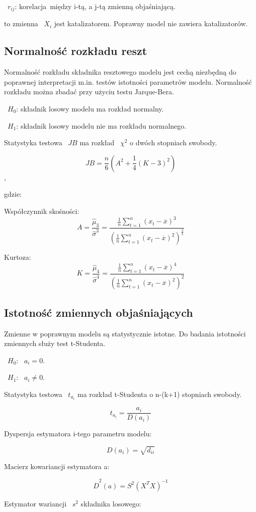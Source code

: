 \documentclass{article}
\begin{document}
~$r_{ij}$: korelacja między i-tą, a j-tą zmienną objaśniającą.

to zmienna ~$X_i$ jest katalizatorem. Poprawny model nie zawiera katalizatorów.

\newpage
\subsection{Normalność rozkładu reszt}
Normalność rozkładu składnika resztowego modelu jest cechą niezbędną do poprawnej interpretacji m.in. testów istotności parametrów modelu. Normalność rozkładu można zbadać przy użyciu testu Jarque-Bera.

~$H_0$: składnik losowy modelu ma rozkład normalny.

~$H_1$: składnik losowy modelu nie ma rozkładu normalnego.

Statystyka testowa ~$JB$ ma rozkład ~$\chi^2$ o dwóch stopniach swobody.

\[JB=\frac{n}{6}(A^2+\frac{1}{4}(K-3)^2)\],

gdzie:

Współczynnik skośności:
\[A = \frac{\hat{\mu}_3}{\hat{\sigma}^3} = 
\frac{\frac{1}{n} \sum_{t=1}^{n} ( x_t - \overline{x} )^3}
{(\frac{1}{n} \sum_{t=1}^{n} ( x_t - \overline{x} )^2)^{\frac{3}{2}}}
\]

Kurtoza:
\[K = \frac{\hat{\mu}_4}{\hat{\sigma}^4} = 
\frac{\frac{1}{n} \sum_{t=1}^{n} ( x_t - \overline{x} )^4}
{(\frac{1}{n} \sum_{t=1}^{n} ( x_t - \overline{x} )^2)^{2}}
\]

\subsection{Istotność zmiennych objaśniających}
Zmienne w poprawnym modelu są statystycznie istotne. Do badania istotności zmiennych służy test t-Studenta.

~$H_0$: ~$a_i = 0$.

~$H_1$: ~$a_i \neq 0$.

Statystyka testowa ~$t_{a_i}$ ma rozkład t-Studenta o n-(k+1) stopniach swobody.

\[t_{a_i} = \frac{a_i}{D(a_i)}\]

Dyspersja estymatora i-tego parametru modelu:

\[D(a_i)=\sqrt{d_{ii}}\]

Macierz kowariancji estymatora a:

\[\hat{D}^2(a)=S^2(X^TX)^{-1}\]

Estymator wariancji ~$s^2$ składnika losowego:
\end{document}
